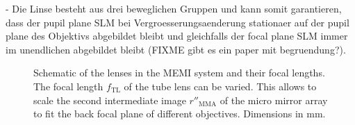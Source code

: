   - Die Linse besteht aus drei beweglichen Gruppen und kann somit
    garantieren, dass der pupil plane SLM bei Vergroesserungsaenderung
    stationaer auf der pupil plane des Objektivs abgebildet bleibt und
    gleichfalls der focal plane SLM immer im unendlichen abgebildet
    bleibt (FIXME gibt es ein paper mit begruendung?).





\begin{figure}[!htbp]
   \centering
   \caption{Schematic of the lenses in the MEMI system and their focal
     lengths. The focal length $f_\textrm{TL}$ of the tube lens can be
     varied. This allows to scale the second intermediate image
     $r''_\textrm{MMA}$ of the micro mirror array to fit the back
     focal plane of different objectives. Dimensions in mm.}
   \label{fig:memi-sketch}
 \end{figure}





